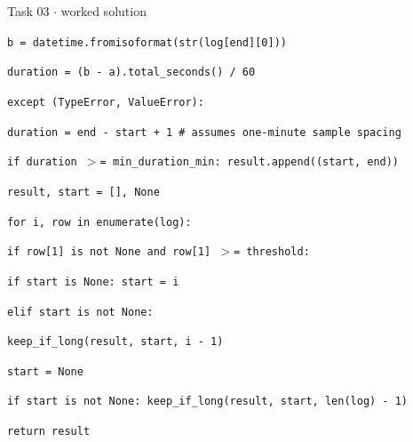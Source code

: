 \documentclass[11pt]{article}
\begin{document}
\begin{keepsection}
\begin{workedbox}{Task 03 \ensuremath{\cdot} worked solution}
\begin{enumerate}
\begin{tcolorbox}[colback=Paperblue,colframe=Paperblue,boxrule=0pt,arc=0pt,left=7pt,right=7pt,top=5pt,bottom=5pt]
\noindent\hspace*{5em}\texttt{b = datetime.fromisoformat(str(log[end][0]))}\par
\noindent\hspace*{5em}\texttt{duration = (b - a).total\_seconds() / 60}\par
\noindent\hspace*{3em}\texttt{except (TypeError, ValueError):}\par
\noindent\hspace*{5em}\texttt{duration = end - start + 1 \# assumes one-minute sample spacing}\par
\noindent\hspace*{3em}\texttt{if duration \ensuremath{>}= min\_duration\_min: result.append((start, end))}\par
\noindent\hspace*{1em}\texttt{result, start = [], None}\par
\noindent\hspace*{1em}\texttt{for i, row in enumerate(log):}\par
\noindent\hspace*{3em}\texttt{if row[1] is not None and row[1] \ensuremath{>}= threshold:}\par
\noindent\hspace*{5em}\texttt{if start is None: start = i}\par
\noindent\hspace*{3em}\texttt{elif start is not None:}\par
\noindent\hspace*{5em}\texttt{keep\_if\_long(result, start, i - 1)}\par
\noindent\hspace*{5em}\texttt{start = None}\par
\noindent\hspace*{1em}\texttt{if start is not None: keep\_if\_long(result, start, len(log) - 1)}\par
\noindent\hspace*{1em}\texttt{return result}\par
\end{tcolorbox}
\end{enumerate}
\end{workedbox}

\end{keepsection}
\end{document}
